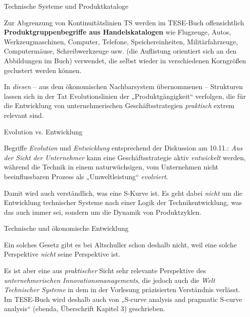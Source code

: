 \documentclass{beamer}
\begin{document}
\begin{frame}{Technische Systeme und Produktkataloge} 

Zur Abgrenzung von Kontinuitätslinien TS werden im TESE-Buch offensichtlich
\textbf{Produktgruppenbegriffe aus Handelskatalogen} wie Flugzeuge, Autos,
Werkzeugmaschinen, Computer, Telefone, Speichereinheiten, Militärfahrzeuge,
Computermäuse, Schreibwerkzeuge usw. (die Auf\-listung orientiert sich an den
Abbildungen im Buch) verwendet, die selbst wieder in verschiedenen Korngrößen
geclustert werden können.

In \emph{diesen} -- aus dem ökonomischen Nachbarsystem übernommenen --
Strukturen lassen sich in der Tat Evolutionslinien der „Produktgängigkeit“
verfolgen, die für die Entwicklung von unternehmerischen Geschäftsstrategien
\emph{praktisch} extrem relevant sind.

\end{frame}

\begin{frame}{Evolution vs. Entwicklung} 

Begriffe \emph{Evolution} und \emph{Entwicklung} entsprechend der Diskussion
am 10.11.: \emph{Aus der Sicht der Unternehmer} kann eine Geschäftsstrategie
aktiv \emph{entwickelt} werden, während die Technik in einem naturwüchsigen,
vom Unternehmen nicht beeinflussbaren Prozess als „Umweltleistung“
\emph{evolviert}.

Damit wird auch verständlich, was eine S-Kurve ist. Es geht dabei \emph{nicht}
um die Entwicklung technischer Systeme nach einer Logik der
Technikentwicklung, was das auch immer sei, sondern um die Dynamik von
Produktzyklen.

\end{frame}

\begin{frame}{Technische und ökonomische Entwicklung} 

Ein solches Gesetz gibt es bei Altschuller schon deshalb nicht, weil eine
solche Perspektive \emph{nicht} seine Perspektive ist.

Es ist aber eine aus \emph{praktischer} Sicht sehr relevante Perspektive des
\emph{unternehmerischen Innovationsmanagements}, die jedoch auch die
\emph{Welt Technischer Systeme} in dem in der Vorlesung präzisierten
Verständnis verlässt.  Im TESE-Buch wird deshalb auch von „S-curve analysis
and pragmatic S-curve analysis“ (ebenda, Überschrift Kapitel 3) geschrieben.
\end{frame}
\end{document}

